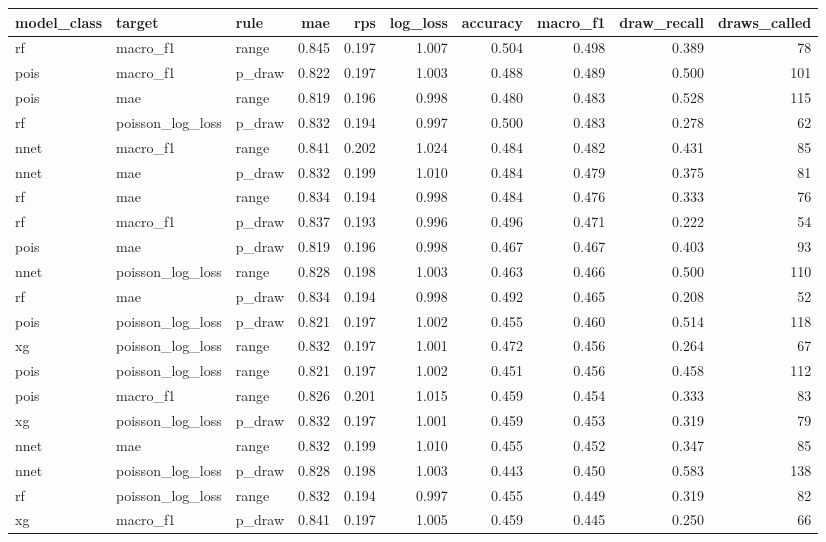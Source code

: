 
\begin{tabular}{lllrrrrrrr}
\toprule
model\_class & target & rule & mae & rps & log\_loss & accuracy & macro\_f1 & draw\_recall & draws\_called\\
\midrule
rf & macro\_f1 & range & 0.845 & 0.197 & 1.007 & 0.504 & 0.498 & 0.389 & 78\\
pois & macro\_f1 & p\_draw & 0.822 & 0.197 & 1.003 & 0.488 & 0.489 & 0.500 & 101\\
pois & mae & range & 0.819 & 0.196 & 0.998 & 0.480 & 0.483 & 0.528 & 115\\
rf & poisson\_log\_loss & p\_draw & 0.832 & 0.194 & 0.997 & 0.500 & 0.483 & 0.278 & 62\\
nnet & macro\_f1 & range & 0.841 & 0.202 & 1.024 & 0.484 & 0.482 & 0.431 & 85\\
nnet & mae & p\_draw & 0.832 & 0.199 & 1.010 & 0.484 & 0.479 & 0.375 & 81\\
rf & mae & range & 0.834 & 0.194 & 0.998 & 0.484 & 0.476 & 0.333 & 76\\
rf & macro\_f1 & p\_draw & 0.837 & 0.193 & 0.996 & 0.496 & 0.471 & 0.222 & 54\\
pois & mae & p\_draw & 0.819 & 0.196 & 0.998 & 0.467 & 0.467 & 0.403 & 93\\
nnet & poisson\_log\_loss & range & 0.828 & 0.198 & 1.003 & 0.463 & 0.466 & 0.500 & 110\\
rf & mae & p\_draw & 0.834 & 0.194 & 0.998 & 0.492 & 0.465 & 0.208 & 52\\
pois & poisson\_log\_loss & p\_draw & 0.821 & 0.197 & 1.002 & 0.455 & 0.460 & 0.514 & 118\\
xg & poisson\_log\_loss & range & 0.832 & 0.197 & 1.001 & 0.472 & 0.456 & 0.264 & 67\\
pois & poisson\_log\_loss & range & 0.821 & 0.197 & 1.002 & 0.451 & 0.456 & 0.458 & 112\\
pois & macro\_f1 & range & 0.826 & 0.201 & 1.015 & 0.459 & 0.454 & 0.333 & 83\\
xg & poisson\_log\_loss & p\_draw & 0.832 & 0.197 & 1.001 & 0.459 & 0.453 & 0.319 & 79\\
nnet & mae & range & 0.832 & 0.199 & 1.010 & 0.455 & 0.452 & 0.347 & 85\\
nnet & poisson\_log\_loss & p\_draw & 0.828 & 0.198 & 1.003 & 0.443 & 0.450 & 0.583 & 138\\
rf & poisson\_log\_loss & range & 0.832 & 0.194 & 0.997 & 0.455 & 0.449 & 0.319 & 82\\
xg & macro\_f1 & p\_draw & 0.841 & 0.197 & 1.005 & 0.459 & 0.445 & 0.250 & 66\\

\end{tabular}
